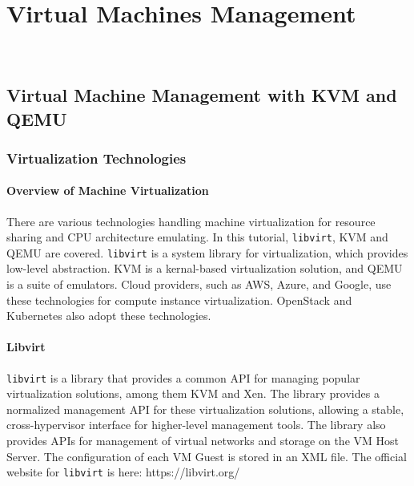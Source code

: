 \chapter{Virtual Machines Management}\label{c:vmm}
\FILENAME\

\hypertarget{virtual-machine-management-with-kvm-and-qemu}{%
\section{Virtual Machine Management with KVM and
QEMU}\label{virtual-machine-management-with-kvm-and-qemu}}

\hypertarget{virtualization-technologies}{%
\subsection{Virtualization
Technologies}\label{virtualization-technologies}}

\hypertarget{overview-of-machine-virtualization}{%
\subsubsection{Overview of Machine
Virtualization}\label{overview-of-machine-virtualization}}

There are various technologies handling machine virtualization for
resource sharing and CPU architecture emulating. In this tutorial,
\texttt{libvirt}, KVM and QEMU are covered. \texttt{libvirt} is a system
library for virtualization, which provides low-level abstraction. KVM is
a kernal-based virtualization solution, and QEMU is a suite of
emulators. Cloud providers, such as AWS, Azure, and Google, use these
technologies for compute instance virtualization. OpenStack and
Kubernetes also adopt these technologies.

\hypertarget{libvirt}{%
\subsubsection{Libvirt}\label{libvirt}}

\texttt{libvirt} is a library that provides a common API for managing
popular virtualization solutions, among them KVM and Xen. The library
provides a normalized management API for these virtualization solutions,
allowing a stable, cross-hypervisor interface for higher-level
management tools. The library also provides APIs for management of
virtual networks and storage on the VM Host Server. The configuration of
each VM Guest is stored in an XML file. The official website for
\texttt{libvirt} is here: https://libvirt.org/

